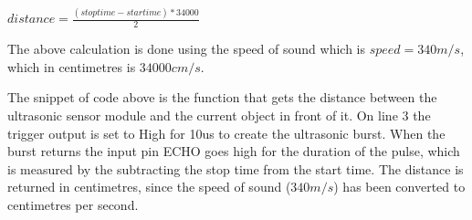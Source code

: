 $distance = \frac{(stoptime-startime) * 34000}{2}$

The above calculation is done using the speed of sound which is $speed = 340m/s$, which in centimetres is $34000cm/s$.

\clearpage


The snippet of code above is the function that gets the distance between the ultrasonic sensor module and the current object in front of it.
On line 3 the trigger output is set to High for 10us to create the ultrasonic burst. When the burst returns the input pin ECHO goes high for the duration of the pulse, which is measured by the subtracting the stop time from the start time.
The distance is returned in centimetres, since the speed of sound ($340m/s$) has been converted to centimetres per second.